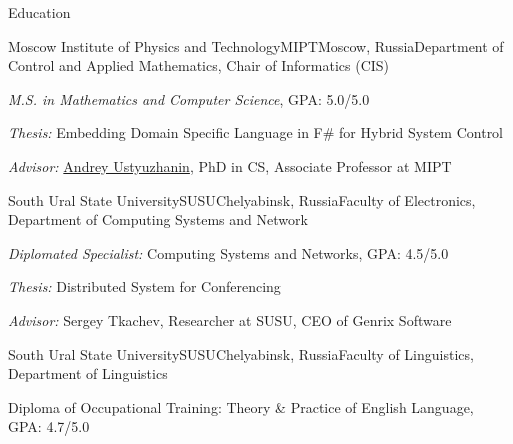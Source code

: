 \documentclass{resume} %
\begin{document}

\begin{rSection}{Education}

\begin{comment}

\begin{rSubsectionEducation}{Keldysh Institute of Applied Mathematics}{KIAM}{Moscow,
Russia}{Program Analysis and Transformation Group}
\item Theoretical Computer Science (2nd year PhD-dropout)
\end{rSubsectionEducation}

\end{comment}


\begin{rSubsectionEducation}{Moscow Institute of Physics and Technology}{MIPT}{Moscow, Russia}{Department of Control and Applied Mathematics, Chair of Informatics (CIS)}
\item \textit{M.S. in Mathematics and Computer Science}, GPA: 5.0/5.0
\item \textit{Thesis:} Embedding Domain Specific Language in F\# for Hybrid System Control
\item \textit{Advisor:} \href{https://ru.linkedin.com/in/andreyustyuzhanin}{Andrey Ustyuzhanin}, PhD in CS, Associate Professor at MIPT
\end{rSubsectionEducation}


\begin{rSubsectionEducation}{South Ural State University}{SUSU}{Chelyabinsk, Russia}{Faculty of
Electronics, Department of Computing Systems and Network}
\item \textit{Diplomated Specialist:} Computing Systems and Networks, GPA: 4.5/5.0
\item \textit{Thesis:} Distributed System for Conferencing
\item \textit{Advisor:} Sergey Tkachev, Researcher at SUSU, CEO of Genrix Software
\end{rSubsectionEducation}


\begin{rSubsectionEducation}{South Ural State University}{SUSU}{Chelyabinsk, Russia}{Faculty of Linguistics, Department of Linguistics}
\item Diploma of Occupational Training: Theory \& Practice of English Language, GPA: 4.7/5.0
\end{rSubsectionEducation}


\end{rSection}
\end{document}
